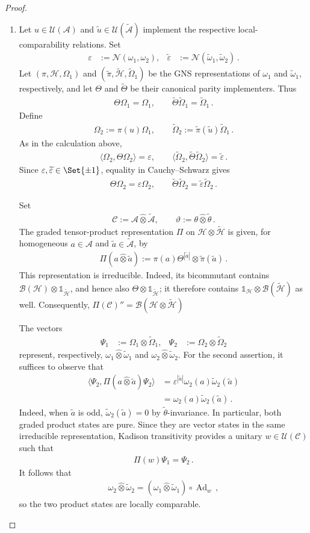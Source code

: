 \documentclass[a4paper,10pt]{article}
\numberwithin{equation}{section}
\theoremstyle{plain}
\theoremstyle{plain}
\theoremstyle{plain}
\theoremstyle{plain}
\theoremstyle{plain}
\theoremstyle{remark}
\theoremstyle{definition}
\newcommand{\calA}{\mathcal{A}}
\newcommand{\calB}{\mathcal{B}}
\newcommand{\calC}{\mathcal{C}}
\newcommand{\calN}{\mathcal{N}}
\newcommand{\calU}{\mathcal{U}}
\newcommand{\calH}{\mathcal{H}}
\newcommand{\ip}[2]{\langle #1, #2 \rangle}
\newcommand{\Ad}[1]{\operatorname{Ad}_{#1}}
\newcommand{\Id}{\mathds{1}}
\newcommand{\eq}[1]{\begin{align*}#1\end{align*}}
\begin{document}
\begin{proof}
\begin{enumerate}
\item Let \(u\in\calU(\calA)\) and
\(\widetilde u\in\calU(\widetilde{\calA})\) implement the respective
local-comparability relations. Set
\eq{
    \varepsilon
    &:=
    \calN(\omega_1,\omega_2),&
    \widetilde\varepsilon
    &:=
    \calN(\widetilde{\omega}_1,\widetilde{\omega}_2)\,.
}
Let \((\pi,\calH,\Omega_1)\) and
\((\widetilde\pi,\widetilde{\calH},\widetilde\Omega_1)\) be the GNS
representations of \(\omega_1\) and \(\widetilde{\omega}_1\),
respectively, and let \(\Theta\) and \(\widetilde\Theta\) be their
canonical parity implementers. Thus
\eq{
    \Theta\Omega_1=\Omega_1,
    \qquad
    \widetilde\Theta\widetilde\Omega_1=\widetilde\Omega_1\,.
}
Define
\eq{
    \Omega_2:=\pi(u)\Omega_1,
    \qquad
    \widetilde\Omega_2
    :=
    \widetilde\pi(\widetilde u)\widetilde\Omega_1\,.
}
As in the calculation above,
\eq{
    \ip{\Omega_2}{\Theta\Omega_2}
    =\varepsilon,
    \qquad
    \ip{\widetilde\Omega_2}
       {\widetilde\Theta\widetilde\Omega_2}
    =\widetilde\varepsilon\,.
}
Since \(\varepsilon,\widetilde\varepsilon\in\Set{\pm1}\), equality in
Cauchy--Schwarz gives
\eq{
    \Theta\Omega_2
    =\varepsilon\Omega_2,
    \qquad
    \widetilde\Theta\widetilde\Omega_2
    =\widetilde\varepsilon\widetilde\Omega_2\,.
}

Set
\eq{
    \calC:=\calA\hat{\otimes}\widetilde{\calA},
    \qquad
    \vartheta:=\theta\hat{\otimes}\widetilde\theta\,.
}
The graded tensor-product representation \(\Pi\) on
\(\calH\otimes\widetilde{\calH}\) is given, for homogeneous
\(a\in\calA\) and \(\widetilde a\in\widetilde{\calA}\), by
\eq{
    \Pi(a\hat{\otimes}\widetilde a)
    :=
    \pi(a)\Theta^{|\widetilde a|}
    \otimes\widetilde\pi(\widetilde a)\,.
}
This representation is irreducible. Indeed, its bicommutant contains
\(\calB(\calH)\otimes\Id_{\widetilde{\calH}}\), and hence also
\(\Theta\otimes\Id_{\widetilde{\calH}}\); it therefore contains
\(\Id_{\calH}\otimes\calB(\widetilde{\calH})\) as well. Consequently,
\(\Pi(\calC)''=\calB(\calH\otimes\widetilde{\calH})\)

The vectors
\eq{
    \Psi_1
    &:=
    \Omega_1\otimes\widetilde\Omega_1,&
    \Psi_2
    &:=
    \Omega_2\otimes\widetilde\Omega_2
}
represent, respectively,
\(\omega_1\hat{\otimes}\widetilde{\omega}_1\) and
\(\omega_2\hat{\otimes}\widetilde{\omega}_2\). For the second assertion,
it suffices to observe that
\eq{
    \ip{\Psi_2}
       {\Pi(a\hat{\otimes}\widetilde a)\Psi_2}
    &=
    \varepsilon^{|\widetilde a|}
    \omega_2(a)\widetilde{\omega}_2(\widetilde a)\\
    &=
    \omega_2(a)\widetilde{\omega}_2(\widetilde a)\,.
}
Indeed, when \(\widetilde a\) is odd,
\(\widetilde{\omega}_2(\widetilde a)=0\) by
\(\widetilde\theta\)-invariance. In particular, both graded product
states are pure. Since they are vector states in the same irreducible
representation, Kadison transitivity provides a unitary
\(w\in\calU(\calC)\) such that
\eq{
    \Pi(w)\Psi_1=\Psi_2\,.
}
It follows that
\eq{
    \omega_2\hat{\otimes}\widetilde{\omega}_2
    =
    \left(
    \omega_1\hat{\otimes}\widetilde{\omega}_1
    \right)\circ\Ad{w}\, ,
}
so the two product states are locally comparable.


\end{enumerate}
\end{proof}
\end{document}
